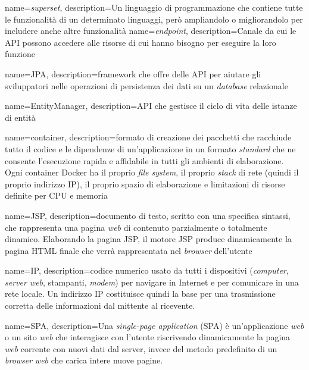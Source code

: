 {
    name=\textit{superset},
    description={Un linguaggio di programmazione che contiene tutte le funzionalità di un determinato linguaggi, però ampliandolo o migliorandolo per includere anche altre funzionalità}
}
{
    name=\textit{endpoint},
    description={Canale da cui le \gls{API} possono accedere alle risorse di cui hanno bisogno per eseguire la loro funzione}
}

{
    name=JPA,
    description={\gls{framework} che offre delle \gls{API} per aiutare gli sviluppatori nelle operazioni di persistenza dei dati su un \textit{database} relazionale}
}


{
    name=EntityManager,
    description={API che gestisce il ciclo di vita delle istanze di entità}
}

{
    name=container,
    description={formato di creazione dei pacchetti che racchiude tutto il codice e le dipendenze di un'applicazione in un formato \textit{standard} che ne consente l'esecuzione rapida e affidabile in tutti gli ambienti di elaborazione.\\ Ogni container Docker ha il proprio \textit{file system}, il proprio \textit{stack} di rete (quindi il proprio indirizzo \gls{IP}), il proprio spazio di elaborazione e limitazioni di risorse definite per CPU e memoria}
}

{
    name=JSP,
    description={documento di testo, scritto con una specifica sintassi, che rappresenta una pagina \textit{web} di contenuto parzialmente o totalmente dinamico. Elaborando la pagina JSP, il motore JSP produce dinamicamente la pagina HTML finale che verrà rappresentata nel \textit{browser} dell'utente}
}

{
    name=IP,
    description={codice numerico usato da tutti i dispositivi (\textit{computer}, \textit{server web}, stampanti, \textit{modem}) per navigare in Internet e per comunicare in una rete locale. Un indirizzo IP costituisce quindi la base per una trasmissione corretta delle informazioni dal mittente al ricevente.}
}

{
    name=SPA,
    description={Una \textit{single-page application} (SPA) è un'applicazione \textit{web} o un sito \textit{web} che interagisce con l'utente riscrivendo dinamicamente la pagina \textit{web} corrente con nuovi dati dal server, invece del metodo predefinito di un \textit{browser} \textit{web} che carica intere nuove pagine.}
}

